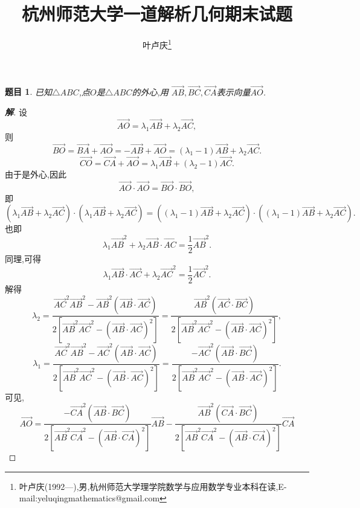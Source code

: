 \documentclass[a4paper]{article}
\newtheorem*{exe}{题目}
\newenvironment{exercise}
{\bigskip\begin{mdframed}\begin{exe}}
    {\end{exe}\end{mdframed}\bigskip}
\newcommand{\ov}{\overrightarrow}
\begin{document}
\title{\huge{\bf{杭州师范大学一道解析几何期末试题}}} \author{\small{叶卢庆\footnote{叶卢庆(1992---),男,杭州师范大学理学院数学与应用数学专业本科在读,E-mail:yeluqingmathematics@gmail.com}}}
\maketitle
\begin{exercise}
  已知$\triangle ABC$,点$O$是$\triangle ABC$的外心,用
  $\ov{AB},\ov{BC},\ov{CA}$表示向量$\ov{AO}$.
\end{exercise}
\begin{proof}[\textbf{解}]
设
$$
\ov{AO}=\lambda_1 \ov{AB}+\lambda_2\ov{AC},
$$
则
$$
\ov{BO}=\ov{BA}+\ov{AO}=-\ov{AB}+\ov{AO}=(\lambda_1-1)\ov{AB}+\lambda_2\ov{AC}.
$$
$$
\ov{CO}=\ov{CA}+\ov{AO}=\lambda_1\ov{AB}+(\lambda_2-1)\ov{AC}.
$$
由于是外心,因此
$$
\ov{AO}\cdot \ov{AO}=\ov{BO}\cdot \ov{BO},
$$
即
\begin{equation}
  \label{eq:1}
  (\lambda_1 \ov{AB}+\lambda_2\ov{AC})\cdot (\lambda_1
  \ov{AB}+\lambda_2\ov{AC})=((\lambda_1-1)\ov{AB}+\lambda_2\ov{AC})\cdot ((\lambda_1-1)\ov{AB}+\lambda_2\ov{AC}).
\end{equation}
也即
\begin{equation}
  \label{eq:2}
  \lambda_1\ov{AB}^2+\lambda_2\ov{AB}\cdot
  \ov{AC}=\frac{1}{2}\ov{AB}^2.
\end{equation}
同理,可得
\begin{equation}
  \label{eq:3}
  \lambda_1\ov{AB}\cdot \ov{AC}+\lambda_2\ov{AC}^2=\frac{1}{2}\ov{AC}^2.
\end{equation}
解得
$$
\lambda_2=\frac{\ov{AC}^2\ov{AB}^2-\ov{AB}^2(\ov{AB}\cdot
  \ov{AC})}{2[\ov{AB}^2\ov{AC}^2-(\ov{AB}\cdot
  \ov{AC})^2]}=\frac{\ov{AB}^2(\ov{AC}\cdot \ov{BC})}{2[\ov{AB}^2\ov{AC}^2-(\ov{AB}\cdot
  \ov{AC})^2]},
$$
$$
\lambda_1=\frac{\ov{AC}^2\ov{AB}^2-\ov{AC}^2(\ov{AB}\cdot
  \ov{AC})}{2[\ov{AB}^2\ov{AC}^2-(\ov{AB}\cdot \ov{AC})^2]}=\frac{-\ov{AC}^2(\ov{AB}\cdot\ov{BC})}{2[\ov{AB}^2\ov{AC}^2-(\ov{AB}\cdot
  \ov{AC})^2]}.
$$
可见,
$$
\ov{AO}=\frac{-\ov{CA}^2(\ov{AB}\cdot\ov{BC})}{2[\ov{AB}^2\ov{CA}^2-(\ov{AB}\cdot
  \ov{CA})^2]}\ov{AB}-\frac{\ov{AB}^2(\ov{CA}\cdot \ov{BC})}{2[\ov{AB}^2\ov{CA}^2-(\ov{AB}\cdot
  \ov{CA})^2]}\ov{CA}
$$

\end{proof}
\end{document}
